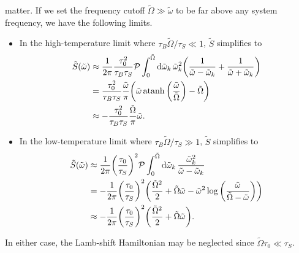 \documentclass[../thesis.tex]{subfiles}
\begin{document}
matter. If we set the frequency cutoff $\tilde{\Omega} \gg \tilde{\omega}$ to be
far above any system frequency, we have the following limits.
\begin{itemize}
  \item In the high-temperature limit where $\tau_B\tilde{\Omega} / \tau_S \ll
    1$, $\tilde{S}$ simplifies to
    \begin{align}
      \tilde{S}(\tilde{\omega})
      &\approx \frac{1}{2\pi} \frac{\tau_0^2}{\tau_B\tau_S}
      \pv\int_0^{\tilde{\Omega}} \dd{\tilde{\omega}_k} \tilde{\omega}_k^2
      \qty(\frac{1}{\tilde{\omega} - \tilde{\omega}_k}
      + \frac{1}{\tilde{\omega} + \tilde{\omega}_k}) \\
      &= \frac{\tau_0^2}{\tau_B\tau_S} \frac{\tilde{\omega}}{\pi}
      \qty(\tilde{\omega}\atanh\qty(\frac{\tilde{\omega}}{\tilde{\Omega}})
      - \tilde{\Omega}) \\
      &\approx -\frac{\tau_0^2}{\tau_B\tau_S}
      \frac{\tilde{\Omega}}{\pi}\tilde{\omega}.
    \end{align}

  \item In the low-temperature limit where $\tau_B\tilde{\Omega} / \tau_S \gg
    1$, $\tilde{S}$ simplifies to
    \begin{align}
      \tilde{S}(\tilde{\omega})
      &\approx \frac{1}{2\pi} {\qty(\frac{\tau_0}{\tau_S})}^2
      \pv\int_0^{\tilde{\Omega}} \dd{\tilde{\omega}_k}
      \frac{\tilde{\omega}_k^2}{\tilde{\omega} - \tilde{\omega}_k} \\
      &= -\frac{1}{2\pi} {\qty(\frac{\tau_0}{\tau_S})}^2 \qty(%
      \frac{\tilde{\Omega}^2}{2} + \tilde{\Omega}\tilde{\omega} -
      \tilde{\omega}^2
      \log\qty(\frac{\tilde{\omega}}{\tilde{\Omega} - \tilde{\omega}})
      ) \\
      &\approx -\frac{1}{2\pi} {\qty(\frac{\tau_0}{\tau_S})}^2 \qty(%
      \frac{\tilde{\Omega}^2}{2} + \tilde{\Omega}\tilde{\omega}
      ).
    \end{align}
\end{itemize}
In either case, the Lamb-shift Hamiltonian may be neglected since
$\tilde{\Omega} \tau_0 \ll \tau_S$.
\end{document}
